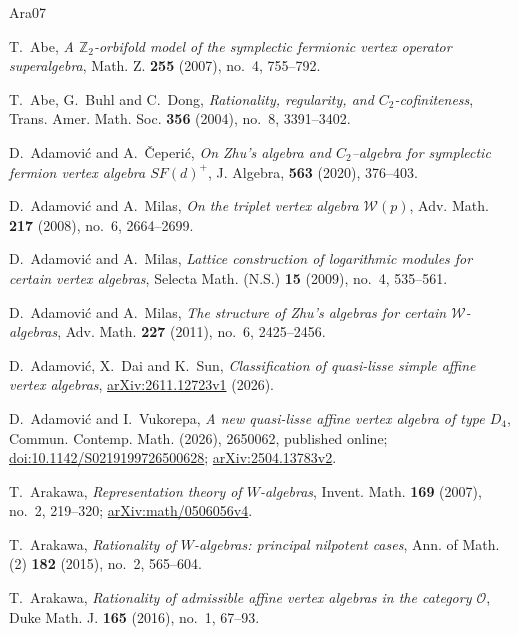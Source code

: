 \documentclass[11pt]{amsart}
\numberwithin{equation}{section}
\theoremstyle{definition}
\theoremstyle{remark}
\begin{document}
 

\begin{thebibliography}{Ara07}

T.~Abe,
\emph{A $\mathbb Z_2$-orbifold model of the symplectic
fermionic vertex operator superalgebra},
Math. Z. \textbf{255} (2007), no.~4, 755--792.

T.~Abe, G.~Buhl and C.~Dong,
\emph{Rationality, regularity, and $C_2$-cofiniteness},
Trans. Amer. Math. Soc. \textbf{356} (2004), no.~8, 3391--3402.

 D.~Adamovi\'c and A.~\v Ceperi\' c,
\emph{ On Zhu's algebra and $C_2$--algebra for symplectic fermion vertex algebra $SF(d)^+$},
 J.  Algebra, {\bf  563}  (2020),  376--403.

D.~Adamovi\'c and A.~Milas,
\emph{On the triplet vertex algebra $\mathcal W(p)$},
Adv. Math. \textbf{217} (2008), no.~6, 2664--2699.

D.~Adamovi\'c and A.~Milas,
\emph{Lattice construction of logarithmic modules for certain
vertex algebras},
Selecta Math. (N.S.) \textbf{15} (2009), no.~4, 535--561.

D.~Adamovi\'c and A.~Milas,
\emph{The structure of Zhu's algebras for certain
$\mathcal W$-algebras},
Adv. Math. \textbf{227} (2011), no.~6, 2425--2456.


D.~Adamovi\'c, X.~Dai and K.~Sun,
\emph{Classification of quasi-lisse simple affine vertex algebras},
\href{https://arxiv.org/abs/2611.12723v1}{arXiv:2611.12723v1}
(2026).


D.~Adamovi\'c and I.~Vukorepa,
\emph{A new quasi-lisse affine vertex algebra of type $D_4$},
Commun. Contemp. Math. (2026), 2650062, published online;
\href{https://doi.org/10.1142/S0219199726500628}{doi:10.1142/S0219199726500628};
\href{https://arxiv.org/abs/2504.13783v2}{arXiv:2504.13783v2}.

T.~Arakawa,
\emph{Representation theory of $W$-algebras},
Invent. Math. \textbf{169} (2007), no.~2, 219--320;
\href{https://arxiv.org/abs/math/0506056v4}{arXiv:math/0506056v4}.

T.~Arakawa,
\emph{Rationality of $W$-algebras: principal nilpotent cases},
Ann. of Math. (2) \textbf{182} (2015), no.~2, 565--604.

T.~Arakawa,
\emph{Rationality of admissible affine vertex algebras in the category $\mathcal O$},
Duke Math. J. \textbf{165} (2016), no.~1, 67--93.


\end{thebibliography}
\end{document}
